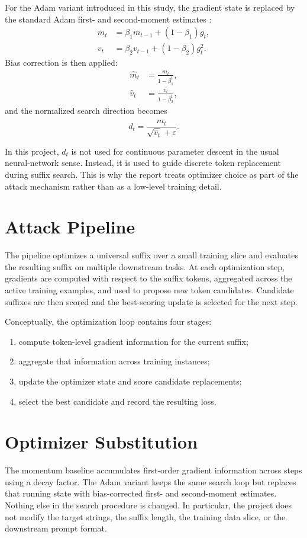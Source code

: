 \documentclass[12pt,a4paper]{report}
\begin{document}
For the Adam variant introduced in this study, the gradient state is replaced by the standard Adam first- and second-moment estimates \cite{kingma2015adam}:
\begin{align}
    m_t &= \beta_1 m_{t-1} + (1-\beta_1) g_t, \\
    v_t &= \beta_2 v_{t-1} + (1-\beta_2) g_t^2.
\end{align}
Bias correction is then applied:
\begin{align}
    \hat{m}_t &= \frac{m_t}{1-\beta_1^t}, \\
    \hat{v}_t &= \frac{v_t}{1-\beta_2^t},
\end{align}
and the normalized search direction becomes
\begin{equation}
    d_t = \frac{\hat{m}_t}{\sqrt{\hat{v}_t}+\varepsilon}.
\end{equation}

In this project, $d_t$ is not used for continuous parameter descent in the usual neural-network sense. Instead, it is used to guide discrete token replacement during suffix search. This is why the report treats optimizer choice as part of the attack mechanism rather than as a low-level training detail.

\section{Attack Pipeline}
The pipeline optimizes a universal suffix over a small training slice and evaluates the resulting suffix on multiple downstream tasks. At each optimization step, gradients are computed with respect to the suffix tokens, aggregated across the active training examples, and used to propose new token candidates. Candidate suffixes are then scored and the best-scoring update is selected for the next step.

Conceptually, the optimization loop contains four stages:
\begin{enumerate}[label=\arabic*.]
\item compute token-level gradient information for the current suffix;
\item aggregate that information across training instances;
\item update the optimizer state and score candidate replacements;
\item select the best candidate and record the resulting loss.
\end{enumerate}

\section{Optimizer Substitution}
The momentum baseline accumulates first-order gradient information across steps using a decay factor. The Adam variant keeps the same search loop but replaces that running state with bias-corrected first- and second-moment estimates. Nothing else in the search procedure is changed. In particular, the project does not modify the target strings, the suffix length, the training data slice, or the downstream prompt format.
\end{document}
